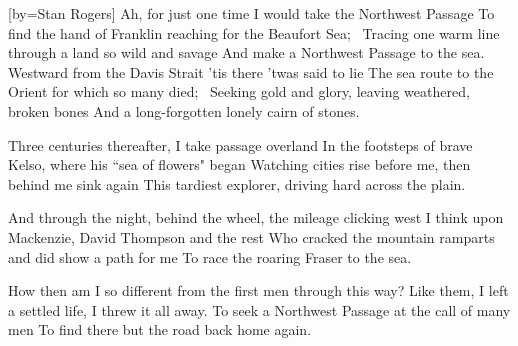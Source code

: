 [by={Stan Rogers}]
\beginchorus \singlespacing
Ah, for just one time I would take the Northwest Passage
To find the hand of Franklin reaching for the Beaufort Sea; 
Tracing one warm line through a land so wild and savage
And make a Northwest Passage to the sea.
\endchorus
\beginverse \singlespacing
Westward from the Davis Strait 'tis there 'twas said to lie
The sea route to the Orient for which so many died; 
Seeking gold and glory, leaving weathered, broken bones
And a long-forgotten lonely cairn of stones.
\endverse
{}

\beginverse \singlespacing
Three centuries thereafter, I take passage overland
In the footsteps of brave Kelso, where his ``sea of flowers" began
Watching cities rise before me, then behind me sink again
This tardiest explorer, driving hard across the plain.
\endverse
{}

\beginverse \singlespacing
And through the night, behind the wheel, the mileage clicking west
I think upon Mackenzie, David Thompson and the rest
Who cracked the mountain ramparts and did show a path for me
To race the roaring Fraser to the sea.
\endverse
{}

\beginverse \singlespacing
How then am I so different from the first men through this way?
Like them, I left a settled life, I threw it all away.
To seek a Northwest Passage at the call of many men
To find there but the road back home again.
\endverse
{}


\endsong
